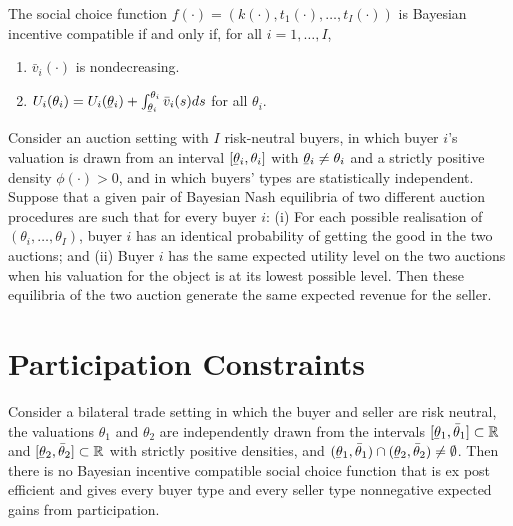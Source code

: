 \begin{prop}
    The social choice function $f(\cdot) = (k(\cdot), t_1(\cdot), \dots, t_I(\cdot))$ is Bayesian incentive compatible if and only if, for all $i = 1, \dots, I$,
    \begin{enumerate}
        \item $\bar{v}_i (\cdot)$ is nondecreasing.
        \item $U_i(\theta_i) = U_i(\ubar{\theta}_i) + \int_{\ubar{\theta}_i}^{\theta_i} \bar{v}_i (s) ds$ for all $\theta_i$.
    \end{enumerate}
\end{prop}

\begin{prop}
    Consider an auction setting with $I$ risk-neutral buyers, in which buyer $i$'s valuation is drawn from an interval $[\ubar{\theta}_i, \theta_i]$ with $\ubar{\theta}_i \neq \theta_i$ and a strictly positive density $\phi(\cdot) > 0$, and in which buyers' types are statistically independent. Suppose that a given pair of Bayesian Nash equilibria of two different auction procedures are such that for every buyer $i$: (i) For each possible realisation of $(\theta_i, \dots, \theta_I)$, buyer $i$ has an identical probability of getting the good in the two auctions; and (ii) Buyer $i$ has the same expected utility level on the two auctions when his valuation for the object is at its lowest possible level. Then these equilibria of the two auction generate the same expected revenue for the seller.
\end{prop}


\section{Participation Constraints}

\begin{prop}
    Consider a bilateral trade setting in which the buyer and seller are risk neutral, the valuations $\theta_1$ and $\theta_2$ are independently drawn from the intervals $[\ubar{\theta}_1, \bar{\theta}_1] \subset \mathbb{R}$ and $[\ubar{\theta}_2, \bar{\theta}_2] \subset \mathbb{R}$ with strictly positive densities, and $(\ubar{\theta}_1, \bar{\theta}_1) \cap (\ubar{\theta}_2, \bar{\theta}_2) \neq \emptyset$. Then there is no Bayesian incentive compatible social choice function that is ex post efficient and gives every buyer type and every seller type nonnegative expected gains from participation.
\end{prop}


